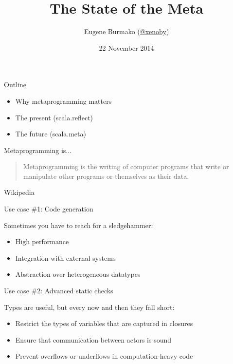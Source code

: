 \documentclass[svgnames,dvipsnames,hyperref={bookmarks=false},usepdftitle=false]{beamer}
\title{The State of the Meta}
\author{Eugene Burmako (\href{https://twitter.com/xeno_by}{@xeno{\textunderscore}by})}
\institute{\'Ecole Polytechnique F\'ed\'erale de Lausanne \\ \texttt{http://scalameta.org/}}
\date{22 November 2014}
\begin{document}
\titleframe

\begin{frame}{Outline}
\begin{itemize}
\item Why metaprogramming matters
\item The present (scala.reflect)
\item The future (scala.meta)
\end{itemize}
\end{frame}


\begin{frame}{Metaprogramming is...}
\begin{quote}
Metaprogramming is the writing of computer programs that write or manipulate other programs or themselves as their data.
\end{quote}
\begin{flushright}
\textemdash Wikipedia
\end{flushright}
\end{frame}

\begin{frame}{Use case \#1: Code generation}

Sometimes you have to reach for a sledgehammer:

\begin{itemize}
\item High performance
\item Integration with external systems
\item Abstraction over heterogeneous datatypes
\end{itemize}

\end{frame}

\begin{frame}{Use case \#2: Advanced static checks}

Types are useful, but every now and then they fall short:

\begin{itemize}
\item Restrict the types of variables that are captured in closures
\item Ensure that communication between actors is sound
\item Prevent overflows or underflows in computation-heavy code
\end{itemize}

\end{frame}
\end{document}
